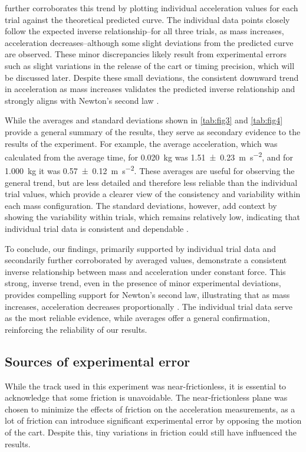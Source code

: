 ﻿\documentclass[reprint,amsmath,amssymb,aps]{revtex4-2}
\begin{document}
 further corroborates this trend by plotting individual acceleration values for each trial against the theoretical predicted curve. The individual data points closely follow the expected inverse relationship–for all three trials, as mass increases, acceleration decreases–although some slight deviations from the predicted curve are observed. These minor discrepancies likely result from experimental errors such as slight variations in the release of the cart or timing precision, which will be discussed later. Despite these small deviations, the consistent downward trend in acceleration as mass increases validates the predicted inverse relationship and strongly aligns with Newton’s second law \cite{knight2017physics}.

While the averages and standard deviations shown in \cref{tab:fig3} and \ref{tab:fig4} provide a general summary of the results, they serve as secondary evidence to the results of the experiment. For example, the average acceleration, which was calculated from the average time, for \qty{0.020}{\kilo\gram} was \qty{1.51\pm0.23}{\meter\per\second\squared}, and for \qty{1.000}{\kilo\gram} it was \qty{0.57\pm0.12}{\meter\per\second\squared}. These averages are useful for observing the general trend, but are less detailed and therefore less reliable than the individual trial values, which provide a clearer view of the consistency and variability within each mass configuration. The standard deviations, however, add context by showing the variability within trials, which remains relatively low, indicating that individual trial data is consistent and dependable \cite{starnes2015practice}.

To conclude, our findings, primarily supported by individual trial data and secondarily further corroborated by averaged values, demonstrate a consistent inverse relationship between mass and acceleration under constant force. This strong, inverse trend, even in the presence of minor experimental deviations, provides compelling support for Newton’s second law, illustrating that as mass increases, acceleration decreases proportionally \cite{knight2017physics}. The individual trial data serve as the most reliable evidence, while averages offer a general confirmation, reinforcing the reliability of our results.

\subsection{Sources of experimental error}
While the track used in this experiment was near-frictionless, it is essential to acknowledge that some friction is unavoidable. The near-frictionless plane was chosen to minimize the effects of friction on the acceleration measurements, as a lot of friction can introduce significant experimental error by opposing the motion of the cart. Despite this, tiny variations in friction could still have influenced the results.
\end{document}
